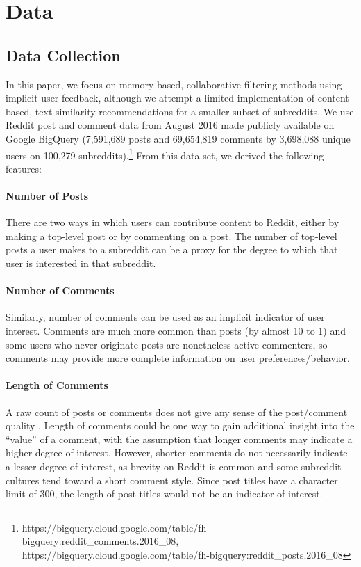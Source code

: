 \documentclass{article}
\begin{document}
\section{Data}
\label{sec:data}

\subsection{Data Collection}
\label{sec:feature-mapping}
In this paper, we focus on memory-based, collaborative filtering methods using implicit user feedback, although we attempt a limited implementation of content based, text similarity recommendations for a smaller subset of subreddits.  We use Reddit post and comment data from August 2016 made publicly available on Google BigQuery (7,591,689 posts and 69,654,819 comments by 3,698,088 unique users on 100,279 subreddits).\footnote{https://bigquery.cloud.google.com/table/fh-bigquery:reddit\_comments.2016\_08, https://bigquery.cloud.google.com/table/fh-bigquery:reddit\_posts.2016\_08} From this data set, we derived the following features:

\paragraph{Number of Posts} There are two ways in which users can contribute content to Reddit, either by making a top-level post or by commenting on a post.  The number of top-level posts a user makes to a subreddit can be a proxy for the degree to which that user is interested in that subreddit.  

\paragraph{Number of Comments} Similarly, number of comments can be used as an implicit indicator of user interest.  Comments are much more common than posts (by almost 10 to 1) and some users who never originate posts are nonetheless active commenters, so comments may provide more complete information on user preferences/behavior. 

\paragraph{Length of Comments} A raw count of posts or comments does not give any sense of the post/comment quality .  Length of comments could be one way to gain additional insight into the “value” of a comment, with the assumption that longer comments may indicate a higher degree of interest.  However, shorter comments do not necessarily indicate a lesser degree of interest, as brevity on Reddit is common and some subreddit cultures tend toward a short comment style.  Since post titles have a character limit of 300, the length of post titles would not be an indicator of interest.  
\end{document}
